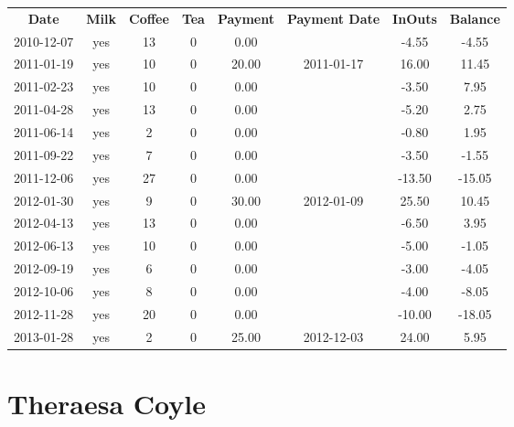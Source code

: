 \begin{center}
\begin{tabular}{cccccccc}
\textbf{Date} & \textbf{Milk} & \textbf{Coffee} & \textbf{Tea} & \textbf{Payment} & \textbf{Payment Date} & \textbf{InOuts} & \textbf{Balance} \\
2010-12-07 & yes & 13 & 0 &  0.00 &  &  -4.55 &  -4.55\\ 
2011-01-19 & yes & 10 & 0 & 20.00 & 2011-01-17 &  16.00 &  11.45\\ 
2011-02-23 & yes & 10 & 0 &  0.00 &  &  -3.50 &   7.95\\ 
2011-04-28 & yes & 13 & 0 &  0.00 &  &  -5.20 &   2.75\\ 
2011-06-14 & yes &  2 & 0 &  0.00 &  &  -0.80 &   1.95\\ 
2011-09-22 & yes &  7 & 0 &  0.00 &  &  -3.50 &  -1.55\\ 
2011-12-06 & yes & 27 & 0 &  0.00 &  & -13.50 & -15.05\\ 
2012-01-30 & yes &  9 & 0 & 30.00 & 2012-01-09 &  25.50 &  10.45\\ 
2012-04-13 & yes & 13 & 0 &  0.00 &  &  -6.50 &   3.95\\ 
2012-06-13 & yes & 10 & 0 &  0.00 &  &  -5.00 &  -1.05\\ 
2012-09-19 & yes &  6 & 0 &  0.00 &  &  -3.00 &  -4.05\\ 
2012-10-06 & yes &  8 & 0 &  0.00 &  &  -4.00 &  -8.05\\ 
2012-11-28 & yes & 20 & 0 &  0.00 &  & -10.00 & -18.05\\ 
2013-01-28 & yes &  2 & 0 & 25.00 & 2012-12-03 &  24.00 &   5.95
\end{tabular}
\end{center}

\section{Theraesa Coyle}

